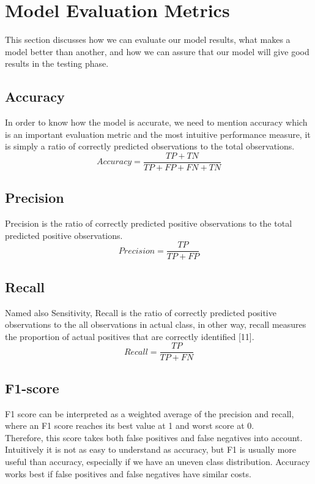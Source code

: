 \section{Model Evaluation Metrics}
This section discusses how we can evaluate our model results, what makes a model better than
another, and how we can assure that our model will give good results in the testing phase.

\subsection{Accuracy}
In order to know how the model is accurate, we need to mention accuracy which is an important
evaluation metric and the most intuitive performance measure, it is simply a ratio of correctly
predicted observations to the total observations.\\
\textbf{\[Accuracy =\frac{TP+TN}{TP+FP+FN+TN}\]}

\subsection{Precision   }
Precision is the ratio of correctly predicted positive observations to the total predicted positive observations.\\
\textbf{\[Precision =\frac{TP}{TP+FP}\]}


\subsection{Recall   } Named also Sensitivity, Recall is the ratio of correctly predicted positive observations to the all observations in actual class, in other way, recall measures the proportion of actual positives that are correctly identified [11].
\textbf{\[Recall =\frac{TP}{TP+FN}\]}
% 
\subsection{F1-score   }  F1 score can be interpreted as a weighted average of the precision and recall, where an F1 score reaches its best value at 1 and worst score at 0.  \\

Therefore, this score takes both false positives and false negatives into account. Intuitively it is not as easy to understand as accuracy, but F1 is usually more useful than accuracy, especially if we have an uneven class distribution. Accuracy works best if false positives and false negatives have similar costs.\\

